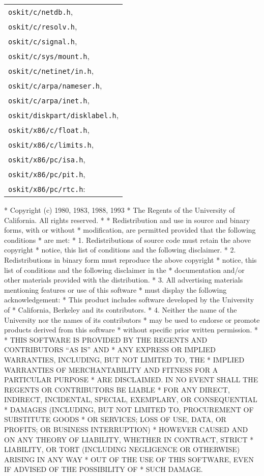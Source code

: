 \begin{tabular}{l}
\texttt{oskit/\-c/\-netdb.h},  \\
\texttt{oskit/\-c/\-resolv.h},  \\
\texttt{oskit/\-c/\-signal.h},  \\
\texttt{oskit/\-c/\-sys/\-mount.h},  \\
\texttt{oskit/\-c/\-netinet/\-in.h},  \\
\texttt{oskit/\-c/\-arpa/\-nameser.h},  \\
\texttt{oskit/\-c/\-arpa/\-inet.h},  \\
\texttt{oskit/\-diskpart/\-disklabel.h},  \\
\texttt{oskit/\-x86/\-c/\-float.h},  \\
\texttt{oskit/\-x86/\-c/\-limits.h},  \\
\texttt{oskit/\-x86/\-pc/\-isa.h},  \\
\texttt{oskit/\-x86/\-pc/\-pit.h},  \\
\texttt{oskit/\-x86/\-pc/\-rtc.h}:  \\
\end{tabular}
\begin{copyrightEnv}
 * Copyright (c) 1980, 1983, 1988, 1993
 *      The Regents of the University of California.  All rights reserved.
 *
 * Redistribution and use in source and binary forms, with or without
 * modification, are permitted provided that the following conditions
 * are met:
 * 1. Redistributions of source code must retain the above copyright
 *    notice, this list of conditions and the following disclaimer.
 * 2. Redistributions in binary form must reproduce the above copyright
 *    notice, this list of conditions and the following disclaimer in the
 *    documentation and/or other materials provided with the distribution.
 * 3. All advertising materials mentioning features or use of this software
 *    must display the following acknowledgement:
 *      This product includes software developed by the University of
 *      California, Berkeley and its contributors.
 * 4. Neither the name of the University nor the names of its contributors
 *    may be used to endorse or promote products derived from this software
 *    without specific prior written permission.
 *
 * THIS SOFTWARE IS PROVIDED BY THE REGENTS AND CONTRIBUTORS ``AS IS'' AND
 * ANY EXPRESS OR IMPLIED WARRANTIES, INCLUDING, BUT NOT LIMITED TO, THE
 * IMPLIED WARRANTIES OF MERCHANTABILITY AND FITNESS FOR A PARTICULAR PURPOSE
 * ARE DISCLAIMED.  IN NO EVENT SHALL THE REGENTS OR CONTRIBUTORS BE LIABLE
 * FOR ANY DIRECT, INDIRECT, INCIDENTAL, SPECIAL, EXEMPLARY, OR CONSEQUENTIAL
 * DAMAGES (INCLUDING, BUT NOT LIMITED TO, PROCUREMENT OF SUBSTITUTE GOODS
 * OR SERVICES; LOSS OF USE, DATA, OR PROFITS; OR BUSINESS INTERRUPTION)
 * HOWEVER CAUSED AND ON ANY THEORY OF LIABILITY, WHETHER IN CONTRACT, STRICT
 * LIABILITY, OR TORT (INCLUDING NEGLIGENCE OR OTHERWISE) ARISING IN ANY WAY
 * OUT OF THE USE OF THIS SOFTWARE, EVEN IF ADVISED OF THE POSSIBILITY OF
 * SUCH DAMAGE.
\end{copyrightEnv}

